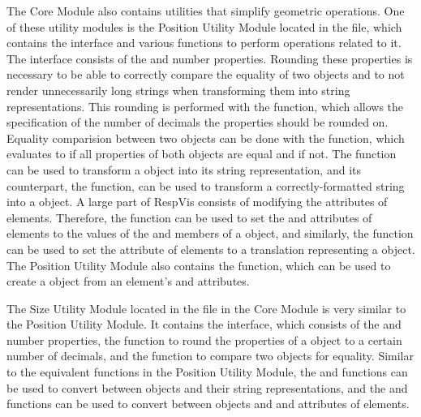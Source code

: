 The Core Module also contains utilities that simplify geometric operations.
One of these utility modules is the Position Utility Module located in the  file, which contains the  interface and various functions to perform operations related to it.
The  interface consists of the  and  number properties.
Rounding these properties is necessary to be able to correctly compare the equality of two  objects and to not render unnecessarily long strings when transforming them into string representations.
This rounding is performed with the  function, which allows the specification of the number of decimals the properties should be rounded on.
Equality comparision between two  objects can be done with the  function, which evaluates to  if all properties of both  objects are equal and  if not.
The  function can be used to transform a  object into its  string representation, and its counterpart, the  function, can be used to transform a correctly-formatted string into a  object.
A large part of RespVis consists of modifying the attributes of elements.
Therefore, the  function can be used to set the  and  attributes of elements to the values of the  and  members of a  object, and similarly, the  function can be used to set the  attribute of elements to a translation representing a  object.
The Position Utility Module also contains the  function, which can be used to create a  object from an element's  and  attributes.

The Size Utility Module located in the  file in the Core Module is very similar to the Position Utility Module.
It contains the  interface, which consists of the  and  number properties, the  function to round the properties of a  object to a certain number of decimals, and the  function to compare two  objects for equality.
Similar to the equivalent functions in the Position Utility Module, the  and  functions can be used to convert between  objects and their string representations, and the  and  functions can be used to convert between  objects and  and  attributes of elements.

